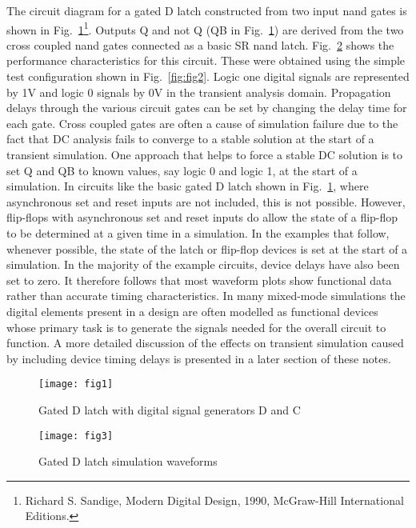 The circuit diagram for a gated D latch constructed from two input
nand gates is shown in Fig.~\ref{fig:fig1}\footnote{Richard
S. Sandige, Modern Digital Design, 1990, McGraw-Hill International
Editions.}.  Outputs Q and not Q (QB in Fig.~\ref{fig:fig1}) are
derived from the two cross coupled nand gates connected as a basic SR
nand latch.  Fig.~\ref{fig:fig3} shows the performance characteristics
for this circuit.  These were obtained using the simple test
configuration shown in Fig.~\ref{fig:fig2}.  Logic one digital signals
are represented by 1V and logic 0 signals by 0V in the transient
analysis domain.  Propagation delays through the various circuit gates
can be set by changing the delay time for each gate. Cross coupled
gates are often a cause of simulation failure due to the fact that DC
analysis fails to converge to a stable solution at the start of a
transient simulation. One approach that helps to force a stable DC
solution is to set Q and QB to known values, say logic 0 and logic 1,
at the start of a simulation.  In circuits like the basic gated D
latch shown in Fig.~\ref{fig:fig1}, where asynchronous set and reset
inputs are not included, this is not possible. However, flip-flops
with asynchronous set and reset inputs do allow the state of a
flip-flop to be determined at a given time in a simulation.  In the
examples that follow, whenever possible, the state of the latch or
flip-flop devices is set at the start of a simulation.  In the
majority of the example circuits, device delays have also been set to
zero. It therefore follows that most waveform plots show functional
data rather than accurate timing characteristics.  In many mixed-mode
simulations the digital elements present in a design are often
modelled as functional devices whose primary task is to generate the
signals needed for the overall circuit to function. A more detailed
discussion of the effects on transient simulation caused by including
device timing delays is presented in a later section of these notes.

\begin{figure}[ht]
  \centering
	\texttt{[image: fig1]}
        \caption{Gated D latch with digital signal generators D and C}
  \label{fig:fig1}
\end{figure} 

\begin{figure}[ht]
  \centering
	\texttt{[image: fig3]}
        \caption{Gated D latch simulation waveforms}
        \label{fig:fig3}
\end{figure} 

